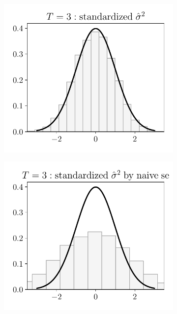 \begin{figure}[h!]
\begin{subfigure}{0.3\textwidth}
	\end{subfigure}
	\begin{subfigure}{0.3\textwidth}
		\centering
		\includegraphics[width=1\linewidth]{plots/simulation/sigma_T_3.pdf}
	\end{subfigure}
	\begin{subfigure}{0.3\textwidth}
		\centering
		\includegraphics[width=1\linewidth]{plots/simulation/sigma_T_3_wrong.pdf}

\end{subfigure}
\end{figure}
